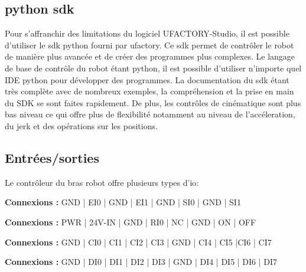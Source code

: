 \subsection{\gls{python} \gls{sdk}}
Pour s'affranchir des limitations du logiciel UFACTORY-Studio, il est possible d'utiliser le \gls{sdk} \gls{python} \cite{PythonSDK} fourni par \gls{ufactory}. Ce \gls{sdk} permet de contrôler le robot de manière plus avancée et de créer des programmes plus complexes. Le langage de base de contrôle du robot étant \gls{python}, il est possible d'utiliser n'importe quel \gls{IDE} \gls{python} pour développer des programmes. La documentation du \gls{sdk} étant très complète avec de nombreux exemples, la compréhension et la prise en main du SDK se sont faites rapidement. De plus, les contrôles de cinématique sont plus bas niveau ce qui offre plus de flexibilité notamment au niveau de l'accéleration, du \gls{jerk} et des opérations sur les positions.

\subsection{Entrées/sorties}
Le contrôleur du bras robot offre plusieurs types d'\gls{io}:


\begin{tcolorbox}[colframe=black, colback=SafetyColor, title=Safety]
    \textbf{Connexions :} GND | EI0 | GND | EI1 | GND | SI0 | GND | SI1
\end{tcolorbox}

\begin{tcolorbox}[colframe=black, colback=PowerColor, title=Power]
    \textbf{Connexions :} PWR | 24V-IN | GND | RI0 | NC | GND | ON | OFF
\end{tcolorbox}

\begin{tcolorbox}[colframe=black, colback=ConfigInputColor, title=Configurable Inputs]
    \textbf{Connexions :} GND | CI0 | CI1 | CI2 | CI3 | GND | CI4 | CI5 |CI6 | CI7
\end{tcolorbox}

\begin{tcolorbox}[colframe=black, colback=DigitalInputColor, title=Digital Inputs]
    \textbf{Connexions :} GND |  DI0 | DI1 | DI2 | DI3 | GND | DI4 | DI5 | DI6 | DI7
\end{tcolorbox}

